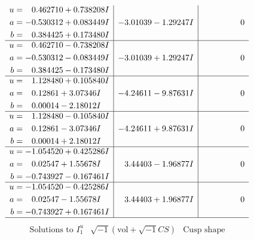 \documentclass[1p]{elsarticle_modified}
\theoremstyle{definition}
\newcommand{\I}{\sqrt{-1}}
\begin{document}
$$\begin{array}{c|c|c}
\begin{aligned}
u &= \phantom{-}0.462710 + 0.738208 I \\
a &= -0.530312 + 0.083449 I \\
b &= \phantom{-}0.384425 + 0.173480 I\end{aligned}
 & -3.01039 - 1.29247 I & \phantom{-0.000000 } 0 \\ \hline\begin{aligned}
u &= \phantom{-}0.462710 - 0.738208 I \\
a &= -0.530312 - 0.083449 I \\
b &= \phantom{-}0.384425 - 0.173480 I\end{aligned}
 & -3.01039 + 1.29247 I & \phantom{-0.000000 } 0 \\ \hline\begin{aligned}
u &= \phantom{-}1.128480 + 0.105840 I \\
a &= \phantom{-}0.12861 + 3.07346 I \\
b &= \phantom{-}0.00014 - 2.18012 I\end{aligned}
 & -4.24611 - 9.87631 I & \phantom{-0.000000 } 0 \\ \hline\begin{aligned}
u &= \phantom{-}1.128480 - 0.105840 I \\
a &= \phantom{-}0.12861 - 3.07346 I \\
b &= \phantom{-}0.00014 + 2.18012 I\end{aligned}
 & -4.24611 + 9.87631 I & \phantom{-0.000000 } 0 \\ \hline\begin{aligned}
u &= -1.054520 + 0.425286 I \\
a &= \phantom{-}0.02547 + 1.55678 I \\
b &= -0.743927 - 0.167461 I\end{aligned}
 & \phantom{-}3.44403 - 1.96877 I & \phantom{-0.000000 } 0 \\ \hline\begin{aligned}
u &= -1.054520 - 0.425286 I \\
a &= \phantom{-}0.02547 - 1.55678 I \\
b &= -0.743927 + 0.167461 I\end{aligned}
 & \phantom{-}3.44403 + 1.96877 I & \phantom{-0.000000 } 0\\
 \hline 
 \end{array}$$\newpage$$\begin{array}{c|c|c}  
\text{Solutions to }I^u_{1}& \I (\text{vol} + \sqrt{-1}CS) & \text{Cusp shape}\\
 \hline 
\begin{aligned}

\end{aligned}
\end{array}$$
\end{document}
